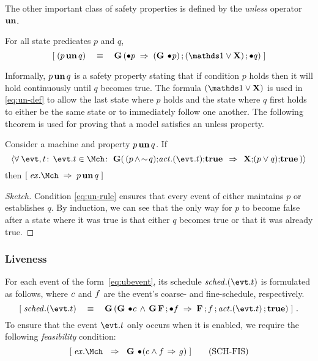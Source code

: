 The other important class of safety properties is defined by the
\emph{unless} operator $\un$.
\begin{Definition}[$\un$ operator]  For all state predicates $p$ and
  $q$,
  \begin{equation}
    \label{eq:un-def}
    \ew{(p \un q) \WIDE{\eqv} \G (\initially p \wide\limp (\G \initially \! p)\,;(\one \lor \X)\,;\initially q)}
  \end{equation}
\end{Definition}
Informally, $p \mathop{\textbf{un}} q$ is a safety property stating that if condition
$p$ holds then it will hold continuously until $q$ becomes true.
The formula $(\one \lor \X)$ is used in \eqref{eq:un-def} to allow
the last state where $p$ holds and the state where $q$ first holds to 
either be the same state or to immediately follow one another.
The following theorem is used for proving that a \unitb model
satisfies an unless property.
\begin{Theorem}
  \label{thm:unless}
  Consider a machine \Mch and property $p \mathop{\textbf{un}} q$.  If
  \begin{equation}
    \label{eq:un-rule}
    \qforall{\evt,t}{\evt.t \in \Mch}{\, \G \!(\,(p \, \land \! \spneg q) ; \!
      \action.(\evt.t);\!\ctrue ~\,\limp\,~ \X ; \! (p \lor q);\! \ctrue \,)}
  \end{equation}
  then $\ew{\execution.\Mch \wide\limp p \un q}$
\end{Theorem}
\begin{proof}[Sketch]
  Condition \eqref{eq:un-rule} ensures that every event of \Mch either
  maintains $p$ or establishes $q$. By induction, we can see that the
  only way for $p$ to become false after a state where it was true is
  that either $q$ becomes true or that it was already true.
\end{proof}

\subsubsection{Liveness}
For each event of the form~\eqref{eq:ubevent}, its schedule
$\schedule.(\evt.t)$ is formulated as follows, where $c$ and
$f$ are the event's coarse- and fine-schedule, respectively.
\begin{equation}
  \label{eq:schedule}
  \ew{\schedule.(\evt.t) \WIDE{\eqv} \G (\G \initially \!\csched
      \,\land\, \G \F\,;\initially \fsched  \wide{\limp} 
      \F\,;\fsched\,;\action.(\evt.t)\,;\ctrue)}~.
\end{equation}
To ensure that the event $\evt.t$ only occurs when it is enabled, we
require the following \emph{feasibility} condition:
\begin{equation}
  \label{eq:fis}
  \ew{\execution.\Mch \Wide{\limp} \G \initially \!(c \land f \, \limp\, g)}
  \tag{SCH-FIS}
\end{equation}

